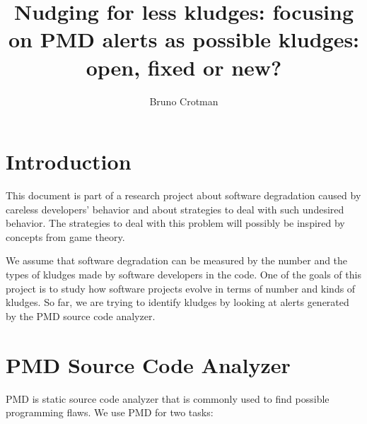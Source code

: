 \documentclass[
]{article}
\title{Nudging for less kludges: focusing on PMD alerts as possible kludges:
open, fixed or new?}
\author{Bruno Crotman}
\date{}
\begin{document}
\maketitle

{
\setcounter{tocdepth}{3}
\tableofcontents
}
\small

\normalsize

\section{Introduction}\label{intro}

This document is part of a research project about software degradation 
caused by careless developers' behavior and about strategies to deal 
with such undesired behavior. The strategies to deal with this problem 
will possibly be inspired by concepts from game theory.

We assume that software degradation can be measured by the number and
the types of kludges made by software developers in the code. One of
the goals of this project is to study how software projects evolve in
terms of number and kinds of kludges. So far, we are trying to identify
kludges by looking at alerts generated by the PMD source code analyzer.





%
%

\section{PMD Source Code Analyzer}\label{pmd}

PMD is static source code analyzer that is commonly used to find
possible programming flaws. We use PMD for two tasks: %
\end{document}
